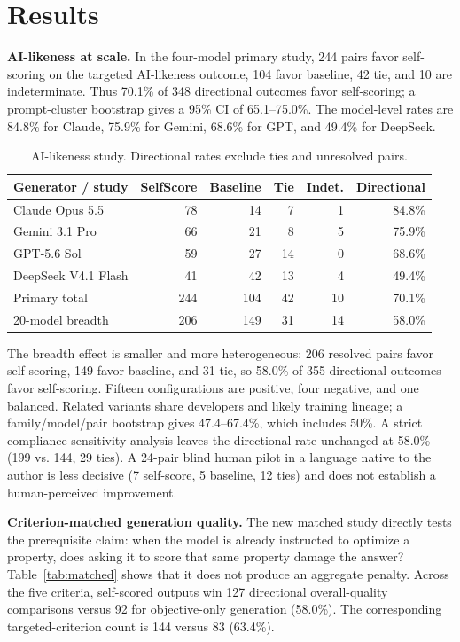 \documentclass[11pt]{article}
\begin{document}
\section{Results}

\textbf{AI-likeness at scale.} In the four-model primary study, 244 pairs favor self-scoring on the targeted AI-likeness outcome, 104 favor baseline, 42 tie, and 10 are indeterminate. Thus 70.1\% of 348 directional outcomes favor self-scoring; a prompt-cluster bootstrap gives a 95\% CI of 65.1--75.0\%. The model-level rates are 84.8\% for Claude, 75.9\% for Gemini, 68.6\% for GPT, and 49.4\% for DeepSeek.

\begin{table}[t]
\centering
\caption{AI-likeness study. Directional rates exclude ties and unresolved pairs.}
\label{tab:ailikeness}
\small
\begin{tabular}{lrrrrr}
\toprule
Generator / study & SelfScore & Baseline & Tie & Indet. & Directional \\
\midrule
Claude Opus 5.5 & 78 & 14 & 7 & 1 & 84.8\% \\
Gemini 3.1 Pro & 66 & 21 & 8 & 5 & 75.9\% \\
GPT-5.6 Sol & 59 & 27 & 14 & 0 & 68.6\% \\
DeepSeek V4.1 Flash & 41 & 42 & 13 & 4 & 49.4\% \\
\midrule
Primary total & 244 & 104 & 42 & 10 & 70.1\% \\
20-model breadth & 206 & 149 & 31 & 14 & 58.0\% \\
\bottomrule
\end{tabular}
\end{table}

The breadth effect is smaller and more heterogeneous: 206 resolved pairs favor self-scoring, 149 favor baseline, and 31 tie, so 58.0\% of 355 directional outcomes favor self-scoring. Fifteen configurations are positive, four negative, and one balanced. Related variants share developers and likely training lineage; a family/model/pair bootstrap gives 47.4--67.4\%, which includes 50\%. A strict compliance sensitivity analysis leaves the directional rate unchanged at 58.0\% (199 vs. 144, 29 ties). A 24-pair blind human pilot in a language native to the author is less decisive (7 self-score, 5 baseline, 12 ties) and does not establish a human-perceived improvement.

\textbf{Criterion-matched generation quality.} The new matched study directly tests the prerequisite claim: when the model is already instructed to optimize a property, does asking it to score that same property damage the answer? Table~\ref{tab:matched} shows that it does not produce an aggregate penalty. Across the five criteria, self-scored outputs win 127 directional overall-quality comparisons versus 92 for objective-only generation (58.0\%). The corresponding targeted-criterion count is 144 versus 83 (63.4\%).
\end{document}
